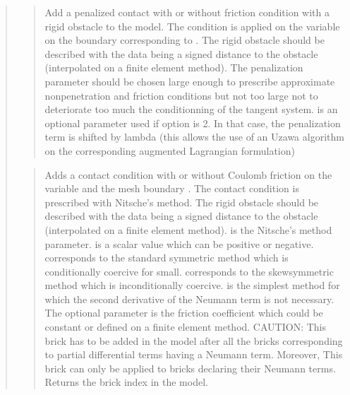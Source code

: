 \documentclass[a4paper,11pt,english]{sphinxmanual}
\begin{document}
\begin{quote}
\begin{quote}

Add a penalized contact with or without friction condition with a
rigid obstacle to the model.
The condition is applied on the variable 
on the boundary corresponding to . The rigid obstacle should
be described with the data  being a signed distance to
the obstacle (interpolated on a finite element method).
The penalization parameter  should be chosen
large enough to prescribe approximate non\sphinxhyphen{}penetration and friction
conditions but not too large not to deteriorate too much the
conditionning of the tangent system.
 is an optional parameter used if option
is 2. In that case, the penalization term is shifted by lambda (this
allows the use of an Uzawa algorithm on the corresponding augmented
Lagrangian formulation)
\end{quote}

\begin{quote}

Adds a contact condition with or without Coulomb friction on the variable
 and the mesh boundary . The contact condition
is prescribed with Nitsche’s method. The rigid obstacle should
be described with the data  being a signed distance to
the obstacle (interpolated on a finite element method).
 is the Nitsche’s method parameter.
 is a scalar value which can be
positive or negative.  corresponds to the standard symmetric
method which is conditionally coercive for   small.
 corresponds to the skew\sphinxhyphen{}symmetric method which is
inconditionally coercive.  is the simplest method
for which the second derivative of the Neumann term is not necessary.
The optional parameter  is the friction
coefficient which could be constant or defined on a finite element
method.
CAUTION: This brick has to be added in the model after all the bricks
corresponding to partial differential terms having a Neumann term.
Moreover, This brick can only be applied to bricks declaring their
Neumann terms. Returns the brick index in the model.
\end{quote}


\end{quote}
\end{document}
